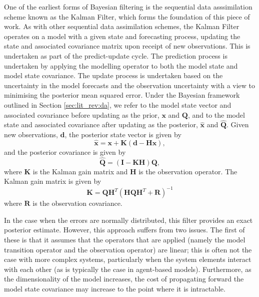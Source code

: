 One of the earliest forms of Bayesian filtering is the sequential data
asssimilation scheme known as the Kalman Filter, which forms the foundation of
this piece of work.
As with other sequential data assimilation schemes, the Kalman Filter operates
on a model with a given state and forecasting process, updating the state and
associated covariance matrix upon receipt of new observations.
This is undertaken as part of the predict-update cycle.
The prediction process is undertaken by applying the modelling operator to both
the model state and model state covariance.
The update process is undertaken based on the uncertainty in the model forecasts
and the observation uncertainty with a view to minimising the posterior mean
squared error.
Under the Bayesian framework outlined in Section \ref{sec:lit_rev:da}, we refer
to the model state vector and associated covariance before updating as the prior,
$\mathbf{x}$ and $\mathbf{Q}$, and to the model state and associated covariance
after updating as the posterior, $\hat{\mathbf{x}}$ and $\hat{\mathbf{Q}}$.
Given new observations, $\mathbf{d}$, the posterior state vector is given by
\begin{equation}
    \hat{\mathbf{x}} = \mathbf{x} + \mathbf{K} \left(
                        \mathbf{d} - \mathbf{H} \mathbf{x} \right),
\end{equation}
and the posterior covariance is given by
\begin{equation}
    \hat{\mathbf{Q}} = \left( \mathbf{I} - \mathbf{K} \mathbf{H} \right)
                        \mathbf{Q},
\end{equation}
where $\mathbf{K}$ is the Kalman gain matrix and $\mathbf{H}$ is the observation operator.
The Kalman gain matrix is given by
\begin{equation}
    \mathbf{K} = \mathbf{Q} \mathbf{H}^T \left(
                    \mathbf{H} \mathbf{Q} \mathbf{H}^T + \mathbf{R}
                 \right) ^ {-1}
\end{equation}
where $\mathbf{R}$ is the observation covariance.

In the case when the errors are normally distributed, this filter provides an
exact posterior estimate.
However, this approach suffers from two issues.
The first of these is that it assumes that the operators that are applied
(namely the model transition operator and the observation operator) are linear;
this is often not the case with more complex systems, particularly when the
system elements interact with each other (as is typically the case in
agent-based models).
Furthermore, as the dimensionality of the model increases, the cost of
propagating forward the model state covariance may increase to the point where
it is intractable.

